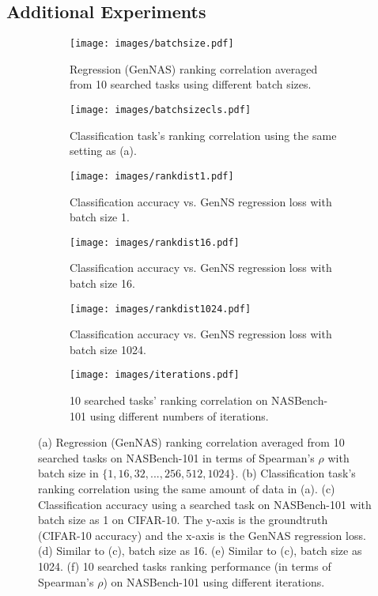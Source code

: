 \documentclass{article}
\begin{document}
\subsection{Additional Experiments}
\begin{figure}[t]
\vspace{-8pt}
     \centering
          \begin{subfigure}[b]{0.49\textwidth}
         \centering
         \texttt{[image: images/batchsize.pdf]}
         \caption{Regression (GenNAS) ranking correlation averaged from 10  searched tasks using different batch sizes.}
         \label{fig:bs}
     \end{subfigure}
     \hfill
     \begin{subfigure}[b]{0.49\textwidth}
         \centering
         \texttt{[image: images/batchsizecls.pdf]}
         \caption{Classification task's ranking correlation using the same setting as (a).}
         \label{fig:cls}
     \end{subfigure}
     \hfill
     \begin{subfigure}[b]{0.49\textwidth}
         \centering
         \texttt{[image: images/rankdist1.pdf]}
         \caption{Classification accuracy vs. GenNS regression loss with batch size 1.}
         \label{fig:dist1}
     \end{subfigure}
     \hfill
     \centering
     \begin{subfigure}[b]{0.49\textwidth}
         \centering
         \texttt{[image: images/rankdist16.pdf]}
         \caption{Classification accuracy vs. GenNS regression loss with batch size 16.}
         \label{fig:dist16}
     \end{subfigure}
     \hfill
     \begin{subfigure}[b]{0.49\textwidth}
         \centering
         \texttt{[image: images/rankdist1024.pdf]}
         \caption{Classification accuracy vs. GenNS regression loss with batch size 1024.}
         \label{fig:dist512}
     \end{subfigure}
     \hfill
     \begin{subfigure}[b]{0.49\textwidth}
         \centering
         \texttt{[image: images/iterations.pdf]}
         \caption{10 searched tasks' ranking correlation on NASBench-101 using different numbers of iterations.}
         \label{fig:iters}
     \end{subfigure}
      \hfill
     \hfill
        \caption{(a) Regression (GenNAS) ranking correlation averaged from 10 searched tasks on NASBench-101 in terms of Spearman's $\rho$ with batch size in $\{1, 16, 32, ..., 256, 512, 1024\}$. (b) Classification task's ranking correlation using the same amount of data in (a). (c) Classification accuracy using a searched task on NASBench-101 with batch size as 1 on CIFAR-10. The y-axis is the groundtruth (CIFAR-10 accuracy) and the x-axis is the GenNAS regression loss. (d) Similar to (c), batch size as 16. (e) Similar to (c), batch size as 1024. (f) 10 searched tasks ranking performance (in terms of Spearman's $\rho$) on NASBench-101 using different iterations. }

\end{figure}
\end{document}

